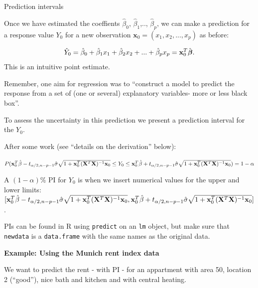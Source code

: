 \documentclass[10pt,ignorenonframetext,]{beamer}
\begin{document}
\begin{frame}

\begin{block}{Prediction intervals}

Once we have estimated the coeffients \(\hat\beta_0\),
\(\hat\beta_1\),.., \(\hat\beta_p\), we can make a prediction for a
response value \(Y_0\) for a new observation
\(\mathbf x_0 = (x_1, x_2, ..., x_p)\) as before:

\[\hat Y_0 = \hat \beta_0 + \hat \beta_1 x_1 + \hat \beta_2 x_2 + ... + \hat \beta_p x_p ={\bf x}_0^T \hat{\boldsymbol\beta}.\]
This is an intuitive point estimate.

Remember, one aim for regression was to ``construct a model to predict
the response from a set of (one or several) explanatory variables- more
or less black box''.

To assess the uncertainty in this prediction we present a prediction
interval for the \(Y_0\).

\end{block}

\end{frame}

\begin{frame}

After some work (see ``details on the derivation'' below):

\(P({\bf x}_0^T \hat{\beta}-t_{\alpha/2,n-p-1}\hat{\sigma}\sqrt{1+{\bf x}_0^T({\bf X}^T{\bf X})^{-1}{\bf x}_0} \le Y_0 \le {\bf x}_0^T \hat{\beta}+t_{\alpha/2,n-p-1}\hat{\sigma}\sqrt{1+{\bf x}_0^T({\bf X}^T{\bf X})^{-1}{\bf x}_0})=1-\alpha\)

A \((1-\alpha)\)\% PI for \(Y_0\) is when we insert numerical values for
the upper and lower limits:
\([{\bf x}_0^T \hat{\beta}-t_{\alpha/2,n-p-1}\hat{\sigma}\sqrt{1+{\bf x}_0^T({\bf X}^T{\bf X})^{-1}{\bf x}_0}, {\bf x}_0^T \hat{\beta}+t_{\alpha/2,n-p-1}\hat{\sigma}\sqrt{1+{\bf x}_0^T({\bf X}^T{\bf X})^{-1}{\bf x}_0}]\).

\end{frame}

\begin{frame}[fragile]

PIs can be found in R using \texttt{predict} on an \texttt{lm} object,
but make sure that \texttt{newdata} is a \texttt{data.frame} with the
same names as the original data.

\textbf{Example: Using the Munich rent index data}

We want to predict the rent - with PI - for an appartment with area 50,
location 2 (``good''), nice bath and kitchen and with central heating.

\end{frame}
\end{document}
